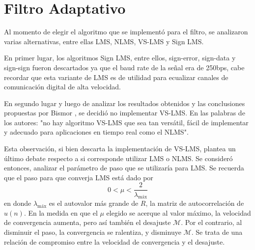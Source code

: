 \documentclass[main.tex]{subfiles}
\begin{document}
\section{Filtro Adaptativo}
Al momento de elegir el algoritmo que se implementó para el filtro, 
se analizaron varias alternativas, entre ellas LMS, NLMS, VS-LMS y Sign LMS.

En primer lugar, los algoritmos Sign LMS, entre ellos, sign-error, sign-data
y sign-sign fueron descartados ya que el baud rate de la señal era de 250bps,
cabe recordar que esta variante de LMS es de utilidad para ecualizar canales de
comunicación digital de alta velocidad. \newline

En segundo lugar y  luego de analizar 
los resultados obtenidos y las conclusiones propuestas por Bismor \cite{bismor},
se decidió no implementar VS-LMS. En las palabras de los autores: 
"no hay algoritmo VS-LMS que sea tan versátil, fácil de implementar y adecuado 
para aplicaciones en tiempo real como el NLMS".\newline

Esta observación, si bien descarta la implementación de VS-LMS, 
plantea un último debate respecto a si corresponde utilizar LMS o NLMS. 
Se consideró entonces, analizar el parámetro de paso que se utilizaría para LMS. 
Se recuerda que el paso para que converja LMS está dado por
\begin{equation}
    0<\mu<\frac{2}{\lambda_\text{máx}}
\end{equation}
en donde $\lambda_\text{máx}$ es el autovalor más grande de $R$, la matriz de 
autocorrelación de $u(n)$. En la medida en que el  $\mu$ elegido se acerque 
al valor máximo, la velocidad de convergencia aumenta, pero así también el desajuste $\mathscr{M}$.
Por el contrario, al disminuir el paso, la convergencia se ralentiza, y disminuye $\mathscr{M}$. 
Se trata de una relación de compromiso entre la velocidad de convergencia y el desajuste.
\end{document}
